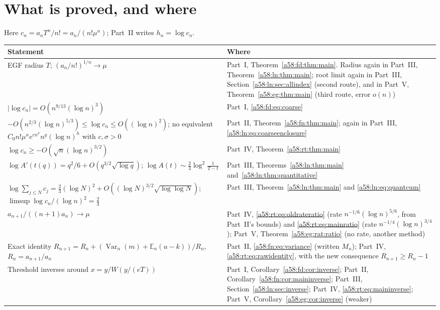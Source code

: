 \documentclass[11pt,letterpaper]{article}
\theoremstyle{remark}
\newcommand{\E}{\mathbb E}
\newcommand{\Var}{\operatorname{Var}}
\begin{document}
\section*{What is proved, and where}\label{a58:sec:status}
Here $c_n=a_nT^n/n!=a_n/(n!\mu^n)$; Part~II writes $h_n=\log c_n$.
\begin{center}
\small
\begin{tabular}{@{}>{\raggedright\arraybackslash}p{} >{\raggedright\arraybackslash}p{}@{}}
\toprule
Statement & Where\\
\midrule
EGF radius $T$; $(a_n/n!)^{1/n}\to\mu$ & Part~I, Theorem~\ref{a58:fd:thm:main}. Radius again in Part~III, Theorem~\ref{a58:ln:thm:main}; root limit again in Part~III, Section~\ref{a58:ln:sec:allindex} (second route), and in Part~V, Theorem~\ref{a58:eg:thm:main} (third route, error $o(n)$)\\
$|\log c_n|=O(n^{9/13}(\log n)^3)$ & Part~I, \eqref{a58:fd:eq:coarse}\\
$-O(n^{2/3}(\log n)^{5/3})\le\log c_n\le O((\log n)^2)$; no equivalent $C_0n!\mu^n e^{cn^\sigma}n^g(\log n)^h$ with $c,\sigma>0$ & Part~II, Theorem~\ref{a58:fn:thm:main}; again in Part~III, \eqref{a58:ln:eq:coarseenclosure}\\
$\log c_n\ge-O(\sqrt n(\log n)^{3/2})$ & Part~IV, Theorem~\ref{a58:rt:thm:main}\\
$\log A'(t(q))=q^2/6+O(q^{3/2}\sqrt{\log q})$; $\log A(t)\sim\frac23\log^2\frac1{T-t}$ & Part~III, Theorems~\ref{a58:ln:thm:main} and~\ref{a58:ln:thm:quantitative}\\
$\log\sum_{j\le N}c_j=\frac23(\log N)^2+O((\log N)^{3/2}\sqrt{\log\log N})$; $\limsup\log c_n/(\log n)^2=\frac23$ & Part~III, Theorem~\ref{a58:ln:thm:main} and \eqref{a58:ln:eq:quantcum}\\
$a_{n+1}/((n+1)a_n)\to\mu$ & Part~IV, \eqref{a58:rt:eq:oldrateratio} (rate $n^{-1/6}(\log n)^{5/6}$, from Part~II's bounds) and \eqref{a58:rt:eq:mainratio} (rate $n^{-1/4}(\log n)^{3/4}$); Part~V, Theorem~\ref{a58:eg:rat:ratio} (no rate, another method)\\
Exact identity $R_{n+1}=R_n+(\Var_n(m)+\E_n(u-k))/R_n$, $R_n=a_{n+1}/a_n$ & Part~II, \eqref{a58:fn:eq:variance} (written $M_n$); Part~IV, \eqref{a58:rt:eq:rawidentity}, with the new consequence $R_{n+1}\ge R_n-1$\\
Threshold inverses around $x=y/W(y/(eT))$ & Part~I, Corollary~\ref{a58:fd:cor:inverse}; Part~II, Corollary~\ref{a58:fn:cor:maininverse}; Part~III, Section~\ref{a58:ln:sec:inverse}; Part~IV, \eqref{a58:rt:eq:maininverse}; Part~V, Corollary~\ref{a58:eg:cor:inverse} (weaker)\\

\end{tabular}
\end{center}
\end{document}
